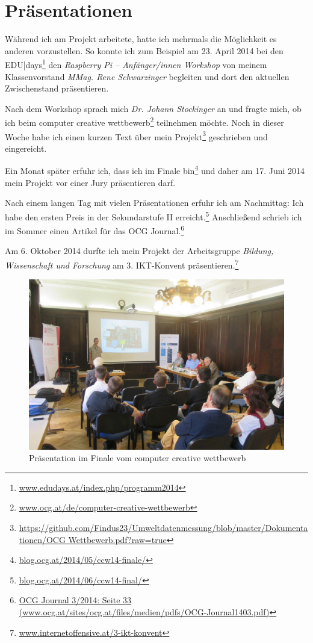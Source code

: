 \chapter{Präsentationen}
\label{anhang:präsentationen}

Während ich am Projekt arbeitete, hatte ich mehrmals die Möglichkeit es anderen vorzustellen. 
So konnte ich zum Beispiel am 23. April 2014 bei den \textsf{EDU|days}\footnote{\href{http://www.edudays.at/index.php/programm2014}{www.edudays.at/index.php/programm2014}} den \emph{Raspberry Pi -- Anfänger/innen Workshop} von meinem Klassenvorstand \emph{MMag. Rene Schwarzinger} begleiten und dort den aktuellen Zwischenstand präsentieren. 

Nach dem Workshop sprach mich \emph{Dr. Johann Stockinger} an und fragte mich, ob ich beim \textsf{computer creative wettbewerb}\footnote{\href{http://www.ocg.at/de/computer-creative-wettbewerb}{www.ocg.at/de/computer-creative-wettbewerb}}
teilnehmen möchte. Noch in dieser Woche habe ich einen kurzen Text über mein Projekt\footnote{\href{https://github.com/Findus23/Umweltdatenmessung/blob/master/Dokumentationen/OCG Wettbewerb.pdf?raw=true}{https://github.com/Findus23/Umweltdatenmessung/blob/master/Dokumentationen/OCG Wettbewerb.pdf?raw=true}}
geschrieben und eingereicht.

Ein Monat später erfuhr ich, dass ich im Finale bin\footnote{\href{http://blog.ocg.at/2014/05/ccw14-finale/}{blog.ocg.at/2014/05/ccw14-finale/}} und daher am 17. Juni 2014 mein Projekt vor einer Jury präsentieren darf. 

Nach einem langen Tag mit vielen Präsentationen erfuhr ich am Nachmittag: Ich habe den ersten Preis in der Sekundarstufe II erreicht.\footnote{\href{http://blog.ocg.at/2014/06/ccw14-final/}{blog.ocg.at/2014/06/ccw14-final/}}
Anschließend schrieb ich im Sommer einen Artikel für das OCG Journal.\footnote{\href{http://www.ocg.at/sites/ocg.at/files/medien/pdfs/OCG-Journal1403.pdf}{OCG Journal 3/2014: Seite 33 (www.ocg.at/sites/ocg.at/files/medien/pdfs/OCG-Journal1403.pdf)}}

Am 6. Oktober 2014 durfte ich mein Projekt der Arbeitsgruppe \textit{Bildung, Wissenschaft und Forschung} am \textsf{3. IKT-Konvent} präsentieren.\footnote{\href{http://www.internetoffensive.at/3-ikt-konvent}{www.internetoffensive.at/3-ikt-konvent}}

\begin{figure}[h]
	\centering
	\includegraphics[width=\textwidth]{figures/ocg.jpg}
	\caption{Präsentation im Finale vom \textsf{computer creative wettbewerb}}
\end{figure}	


